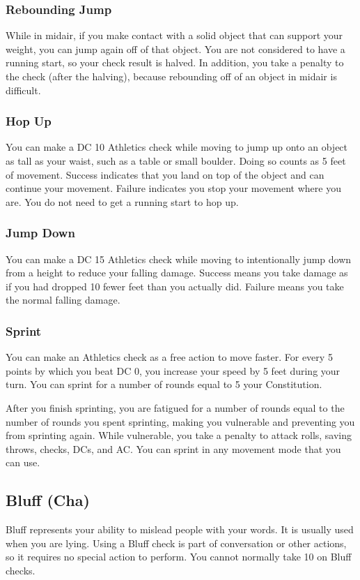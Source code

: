 \subsubsection{Rebounding Jump}\label{Rebounding Jump}
While in midair, if you make contact with a solid object that can support your weight, you can jump again off of that object. You are not considered to have a running start, so your check result is halved. In addition, you take a  penalty to the check (after the halving), because rebounding off of an object in midair is difficult.

\subsubsection{Hop Up}
You can make a DC 10 Athletics check while moving to jump up onto an object as tall as your waist, such as a table or small boulder. Doing so counts as 5 feet of movement. Success indicates that you land on top of the object and can continue your movement. Failure indicates you stop your movement where you are. You do not need to get a running start to hop up.

\subsubsection{Jump Down}
You can make a DC 15 Athletics check while moving to intentionally jump down from a height to reduce your falling damage. Success means you take damage as if you had dropped 10 fewer feet than you actually did. Failure means you take the normal falling damage.

\subsubsection{Sprint}\label{Sprint}
You can make an Athletics check as a free action to move faster. For every 5 points by which you beat DC 0, you increase your speed by 5 feet during your turn. You can sprint for a number of rounds equal to 5 \add your Constitution.

After you finish sprinting, you are fatigued for a number of rounds equal to the number of rounds you spent sprinting, making you vulnerable and preventing you from sprinting again. While vulnerable, you take a  penalty to attack rolls, saving throws, checks, DCs, and AC. You can sprint in any movement mode that you can use.

\subsection{Bluff (Cha)}
Bluff represents your ability to mislead people with your words. It is usually used when you are lying. Using a Bluff check is part of conversation or other actions, so it requires no special action to perform. You cannot normally take 10 on Bluff checks.

